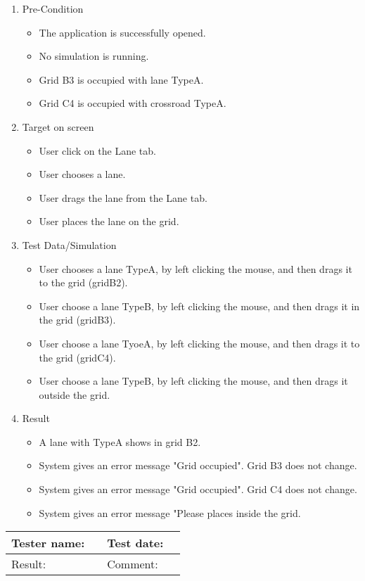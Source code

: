 \begin{enumerate}
	\item Pre-Condition
	\begin{itemize}
		\item The application is successfully opened.
		\item No simulation is running.
		\item Grid B3 is occupied with lane TypeA.
		\item Grid C4 is occupied with crossroad TypeA.
	\end{itemize}
	\item Target on screen
	\begin{itemize}
		\item User click on the Lane tab.
		\item User chooses a lane.
		\item User drags the lane from the Lane tab.
		\item User places the lane on the grid.
	\end{itemize}
	\item Test Data/Simulation
	\begin{itemize}
		\item User chooses a lane TypeA, by left clicking the mouse, and then drags it to the grid (gridB2).
		\item User choose a lane TypeB, by left clicking the mouse, and then drags it in the grid (gridB3).
		\item User choose a lane TyoeA, by left clicking the mouse, and then drags it to the grid (gridC4).
		\item User choose a lane TypeB, by left clicking the mouse, and then drags it outside the grid.
	\end{itemize}
	\item Result
	\begin{itemize}
		\item A lane with TypeA shows in grid B2.
		\item System gives an  error message "Grid occupied". Grid B3 does not change.
		\item System gives an  error message "Grid occupied". Grid C4 does not change.
		\item  System gives an error message "Please places inside the grid.
	\end{itemize}
\end{enumerate}

\begin{tabularx}{\textwidth}{|p{3cm}X|p{3cm}X|}\hline
	Tester name: &  & Test date: & \\\hline
	Result: &  \pass  & Comment: & \\\hline
\end{tabularx}

